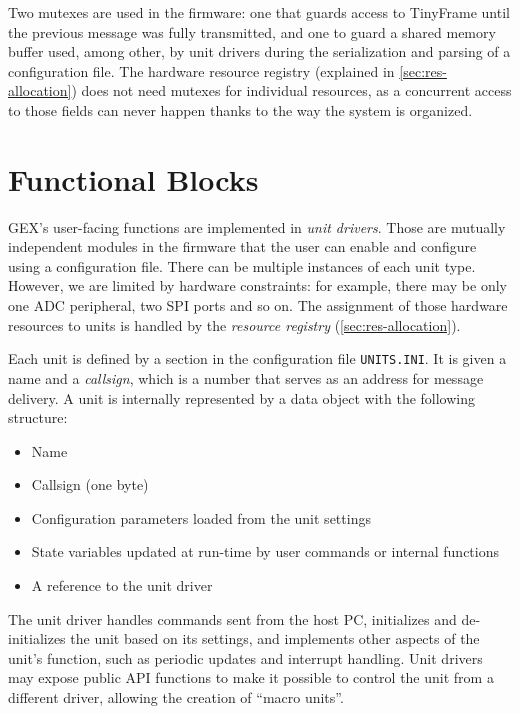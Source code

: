 Two mutexes are used in the firmware: one that guards access to TinyFrame until the previous message was fully transmitted, and one to guard a shared memory buffer used, among other, by unit drivers during the serialization and parsing of a configuration file. The hardware resource registry (explained in \cref{sec:res-allocation}) does not need mutexes for individual resources, as a concurrent access to those fields can never happen thanks to the way the system is organized.

\section{Functional Blocks} \label{sec:units-function}

GEX's user-facing functions are implemented in \textit{unit drivers}. Those are mutually independent modules in the firmware that the user can enable and configure using a configuration file. There can be multiple instances of each unit type. However, we are limited by hardware constraints: for example, there may be only one \gls{ADC} peripheral, two \gls{SPI} ports and so on. The assignment of those hardware resources to units is handled by the \textit{resource registry} (\cref{sec:res-allocation}).

Each unit is defined by a section in the configuration file \verb|UNITS.INI|. It is given a name and a \textit{callsign}, which is a number that serves as an address for message delivery. A unit is internally represented by a data object with the following structure:

\begin{itemize}
	\item Name
	\item Callsign (one byte)
	\item Configuration parameters loaded from the unit settings
	\item State variables updated at run-time by user commands or internal functions
	\item A reference to the unit driver
\end{itemize}

The unit driver handles commands sent from the host \gls{PC}, initializes and de-initializes the unit based on its settings, and implements other aspects of the unit's function, such as periodic updates and interrupt handling. Unit drivers may expose public \gls{API} functions to make it possible to control the unit from a different driver, allowing the creation of ``macro units''.

